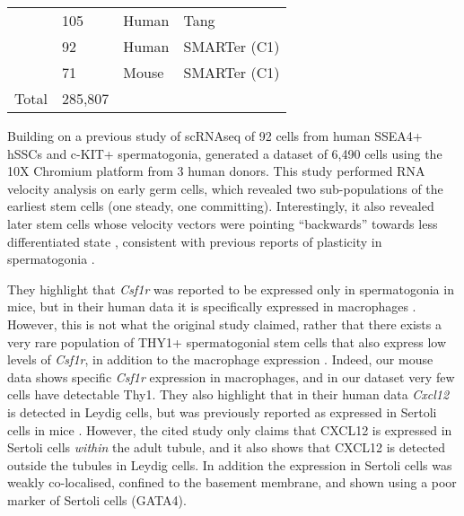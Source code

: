 \begin{table}[]
\begin{tabular}{@{}llll@{}}
		\cite{Neuhaus2017Singlecell}        & 105     & Human          & Tang                    \\
		\cite{Guo2017Chromatin}             & 92      & Human          & SMARTer (C1)      \\
		\cite{Liao2019Revealing}            & 71      & Mouse          & SMARTer (C1)           \\
		Total                                                & 285,807 &                &                             \\ \bottomrule
	\end{tabular}
\end{table}

Building on a previous study \parencite{Guo2017Chromatin} of scRNAseq of 92 cells from human SSEA4+ hSSCs and c-KIT+ spermatogonia, \cite{Guo2018adult} generated a dataset of 6,490 cells using the 10X Chromium platform from 3 human donors.
This study performed RNA velocity analysis on early germ cells, which revealed two sub-populations of the earliest stem cells (one steady, one committing).
Interestingly, it also revealed later stem cells whose velocity vectors were pointing ``backwards'' towards less differentiated state \parencite{Guo2018adult}, consistent with previous reports of plasticity in spermatogonia \parencite{Brawley2004Regeneration, Nakagawa2010Functional, Hara2014Mouse}.

They highlight that \textit{Csf1r} was reported to be expressed only in spermatogonia in mice, but in their human data it is specifically expressed in macrophages \parencite{Guo2018adult}.
However, this is not what the original study claimed, rather that there exists a very rare population of THY1+ spermatogonial stem cells that also express low levels of \textit{Csf1r}, in addition to the macrophage expression \parencite{Oatley2009Colony}.
Indeed, our mouse data shows specific \textit{Csf1r} expression in macrophages, and in our dataset very few cells have detectable Thy1.
They also highlight that in their human data \textit{Cxcl12} is detected in Leydig cells, but was previously reported as expressed in Sertoli cells in mice \parencite{Yang2013CXCL12}.
However, the cited study only claims that CXCL12 is expressed in Sertoli cells \emph{within} the adult tubule, and it also shows that CXCL12 is detected outside the tubules in Leydig cells.
In addition the expression in Sertoli cells was weakly co-localised, confined to the basement membrane, and shown using a poor marker of Sertoli cells (GATA4).

